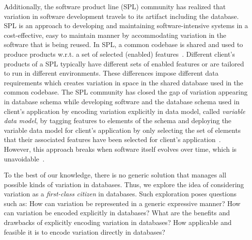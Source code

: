 Additionally, the software product line (SPL) community has realized that 
variation in software development travels to its artifact including the database.
%
SPL is an
approach to developing and maintaining software-intensive systems 
in a cost-effective, easy to maintain manner by accommodating variation
in the software that is being reused. 
%
In SPL, a common codebase is shared and used to produce products w.r.t.
a set of selected (enabled) features~\cite{splBook}. 
%
Different client's products of a SPL typically have different
sets of enabled features or are tailored to run in different environments. These
differences impose different data requirements which creates variation in space 
in the shared database used in the common codebase. 
%
The SPL community has closed
the gap of variation appearing in database schema while developing software
and the database schema used in client's application by
encoding variation explicitly in data model, called \emph{variable data model},
by tagging features to elements of the schema and deploying the variable
data model for client's application by only selecting the set of elements that 
their associated features have been selected for client's application~\cite{}. 
However, this approach breaks when software itself evolves over time, 
which is unavoidable~\cite{dbSPLevolve}.

To the best of our knowledge, 
there is no generic solution that manages all possible kinds of
variation in databases. Thus, we explore the idea of considering
variation as a \emph{first-class citizen} in databases. Such exploration
poses questions such as: How can variation be represented in a generic
expressive manner? How can variation be encoded explicitly in databases?
What are the benefits and drawbacks of explicitly encoding variation in 
databases? How applicable and feasible it is to encode variation 
directly in databases?

